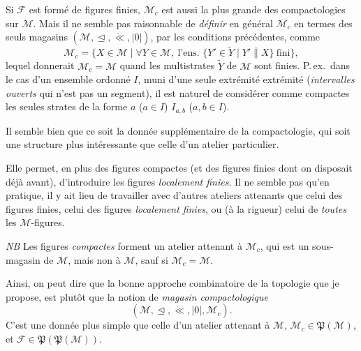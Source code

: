 \documentclass[11pt,a4paper]{article}
\begin{document}
 Si $\mathcal{F}$ est formé de figures finies,  $\mathcal{M}_c$ est aussi la plus grande des compactologies sur $\mathcal{M}$. Mais il ne semble pas raisonnable de \textit{définir} en général $\mathcal{M}_c$ en termes des seuls magasins $(\mathcal{M},\trianglelefteq,\mathring{\ll},|0|)$, par les conditions précédentes, comme 
\[
  \mathcal{M}_c=\{X\in\mathcal{M}\mid \forall Y\in\mathcal{M},\ \text{l'ens. } \{Y'\in\widetilde{Y}\mid Y'\mathbin{\overline{\|}}X\}\ \text{fini}\},
\]
lequel donnerait $\mathcal{M}_c=\mathcal{M}$ quand  les multistrates  $\widetilde{Y}$ de $\mathcal{M}$ sont finies. P.\,ex.\ dans le cas d'un ensemble ordonné $I$, muni d'une seule extrémité   extrémité (\textit{intervalles ouverts} qui n'est pas un segment), il est naturel de considérer comme compactes les seules strates de la forme $a$ ($a\in I$) $I_{a,b}$ ($a,b\in I$).

Il semble bien que ce soit la donnée supplémentaire de la compactologie, qui soit une structure  plus intéressante que celle d'un atelier  particulier.

Elle permet, en plus des  figures compactes (et des figures finies dont on disposait déjà avant), d'introduire les figures \textit{localement finies}. Il ne semble pas qu'en pratique, il y ait lieu de travailler avec d'autres ateliers attenants que celui des figures finies, celui des figures \textit{localement finies}, ou (à la rigueur) celui de \textit{toutes} les $\mathcal{M}$-figures.

\textit{NB} Les figures \textit{compactes} forment un atelier attenant à $\mathcal{M}_c$, qui est un sous-magasin de $\mathcal{M}$, mais non à $\mathcal{M}$, sauf si $\mathcal{M}_c=\mathcal{M}$.

Ainsi, on peut dire que la bonne  approche combinatoire de la topologie \ill{} que je propose, est plutôt  que la notion de \textit{magasin compactologique}
\[
  (\mathcal{M},\trianglelefteq,\mathring{\ll},|0|,\mathcal{M}_c).
\]
C'est une donnée plus simple que celle d'un atelier attenant à $\mathcal{M}$,  $\mathcal{M}_c\in\mathfrak{P}(\mathcal{M})$, et $\mathcal{F}\in\mathfrak{P}(\mathfrak{P}(\mathcal{M}))$.
\end{document}
